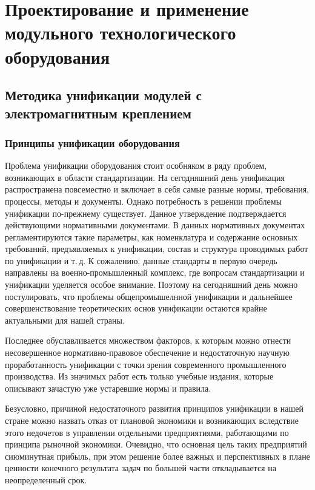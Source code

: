 \chapter{Проектирование и применение модульного технологического оборудования}\label{ch:ch2}

\section{Методика унификации модулей с электромагнитным креплением}

\subsection{Принципы унификации оборудования}

Проблема унификации оборудования стоит особняком в ряду проблем, возникающих в области стандартизации. На сегодняшний день унификация распространена повсеместно и включает в себя самые разные нормы, требования, процессы, методы и документы. Однако потребность в решении проблемы унификации по-прежнему существует. Данное утверждение подтверждается действующими нормативными документами. В данных нормативных документах регламентируются такие параметры, как номенклатура и содержание основных требований, предъявляемых к унификации, состав и структура проводимых работ по унификации и т.\,д. К сожалению, данные стандарты в первую очередь направлены на военно-промышленный комплекс, где вопросам стандартизации и унификации уделяется особое внимание. Поэтому на сегодняшний день можно постулировать, что проблемы общепромышелнной унификации и дальнейшее совершенствование теоретических основ унификации остаются крайне актуальными для нашей страны. 

Последнее обуславливается множеством факторов, к которым можно отнести несовершенное нормативно-правовое обеспечение и недостаточную научную проработанность унификации с точки зрения современного промышленного производства. Из значимых работ есть только учебные издания, которые описывают зачастую уже устаревшие нормы и правила. 

Безусловно, причиной недостаточного развития принципов унификации в нашей стране можно назвать отказ от плановой экономики и возникающих вследствие этого недочетов в управлении отдельными предприятиями, работающими по принципа рыночной экономики. Очевидно, что основная цель таких предприятий сиюминутная прибыль, при этом решение более важных и перспективных в плане ценности конечного результата задач по большей части откладывается на неопределенный срок. 

